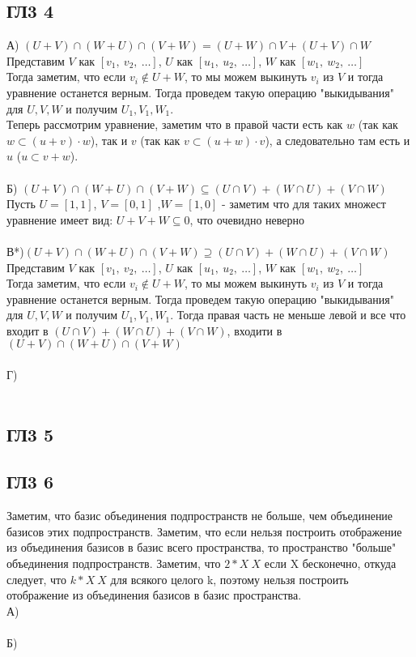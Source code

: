 		\subsection{ГЛ3 4}		
		А) $(U + V) \cap (W + U) \cap (V + W) = (U + W) \cap V + (U + V) \cap W$\\
		Представим $V$ как $[v_1,\ v_2,\ \ldots]$, $U$ как $[u_1,\ u_2,\ \ldots]$, $W$ как $[w_1,\ w_2,\ \ldots]$\\
		Тогда заметим, что если $v_i \notin U+W$, то мы можем выкинуть $v_i$ из $V$ и тогда уравнение останется верным.
		Тогда проведем такую операцию "выкидывания" для $U, V, W$ и получим $U_1, V_1, W_1$.\\
		Теперь рассмотрим уравнение, заметим что в правой части есть как $w$ (так как $w \subset (u+v) \cdot w$), так и $v$ (так как $v \subset (u+w) \cdot v$), а следовательно там есть и $u$ ($u \subset v+w$). \\
		\\
		Б) $(U + V) \cap (W + U) \cap (V + W) \subseteq (U \cap V) + (W \cap U) + (V \cap W)$\\
		Пусть $U = [1, 1]$, $V = [0, 1]$ ,$W = [1, 0]$ - заметим что для таких множест уравнение имеет вид: $U + V + W \subseteq 0$, что очевидно неверно\\
		\\
		В*)$(U + V) \cap (W + U) \cap (V + W) \supseteq (U \cap V) + (W \cap U) + (V \cap W)$\\
		Представим $V$ как $[v_1,\ v_2,\ \ldots]$, $U$ как $[u_1,\ u_2,\ \ldots]$, $W$ как $[w_1,\ w_2,\ \ldots]$\\
		Тогда заметим, что если $v_i \notin U+W$, то мы можем выкинуть $v_i$ из $V$ и тогда уравнение останется верным.
		Тогда проведем такую операцию "выкидывания" для $U, V, W$ и получим $U_1, V_1, W_1$. Тогда правая часть не меньше левой и все что входит в $(U \cap V) + (W \cap U) + (V \cap W)$, входити в $(U + V) \cap (W + U) \cap (V + W)$\\
		\\
		Г)\\
		\\
		
		\subsection{ГЛ3 5}		
		
		
		\subsection{ГЛ3 6}		
		Заметим, что базис объединения подпространств не больше, чем объединение базисов этих подпространств. Заметим, что если нельзя построить отображение из объединения базисов в базис всего пространства, то пространство "больше" объединения подпространств. Заметим, что $2*X ~ X$ если X бесконечно, откуда следует, что $k*X ~ X$ для всякого целого k, поэтому нельзя построить отображение из объединения базисов в базис пространства.\\
		А)\\
		\\
		Б)\\
		\\
		

